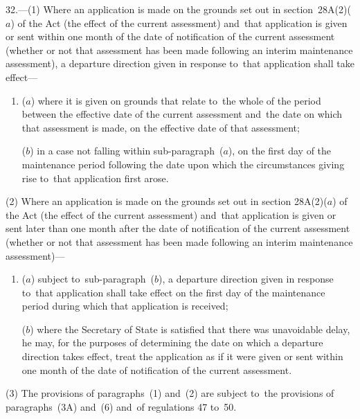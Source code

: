 \documentclass[12pt,a4paper]{article}
\begin{document}
32.—(1) Where an application is made on the grounds set out in section~28A(2)($a$) of the Act (the effect of the current assessment) and~that application is given or sent within 
one month  %
of the date of notification of the current assessment (whether or not that assessment has been made following an interim maintenance assessment), a departure direction given in response to~that application shall take effect—
\begin{enumerate}\item[]
($a$) where it is given on grounds that relate to~the whole of the period between the effective date of the current assessment and~the date on which that assessment is made, on the effective date of that assessment;

($b$) in a case not falling within sub-paragraph~($a$), on the first day of the maintenance period following the date upon which the circumstances giving rise to~that application first arose.
\end{enumerate}

(2) Where an application is made on the grounds set out in section 28A(2)($a$) of the Act (the effect of the current assessment) and~that application is given or sent later than 
one month  %
after the date of notification of the current assessment (whether or not that assessment has been made following an interim maintenance assessment)—
\begin{enumerate}\item[]
($a$) subject to~sub-paragraph~($b$), a departure direction given in response to~that application shall take effect on the first day of the maintenance period during which that application is received;

($b$) where the Secretary of State is satisfied that there was unavoidable delay, he may, for the purposes of determining the date on which a departure direction takes effect, treat the application as if it were given or sent within 
one month  %
of the date of notification of the current assessment.
\end{enumerate}

(3) The provisions of paragraphs~(1) and~(2) are subject to~the provisions of 
paragraphs~(3A) and~(6)  %
and~of regulations 47 to~50.
\end{document}
